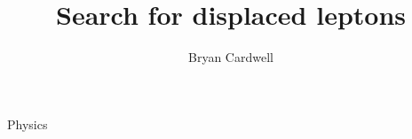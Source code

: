\documentclass{osudissert96}
\begin{document}
\author{Bryan Cardwell}
\title{Search for displaced leptons}
\unit{Physics}
\maketitle

\disscopyright

\begin{abstract}
  
\end{abstract}

\dedication{For Cristiana and Montague.}



\tableofcontents
\listoftables
\listoffigures






%



\end{document}
